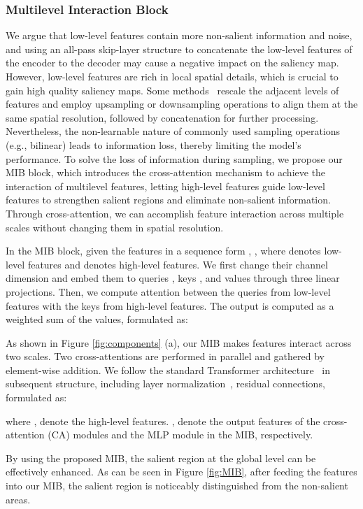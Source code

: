 \documentclass[lettersize,journal]{IEEEtran}
\begin{document}
\subsubsection{Multilevel Interaction Block}
We argue that low-level features contain more non-salient information and noise, and using an all-pass skip-layer structure to concatenate the low-level features of the encoder to the decoder may cause a negative impact on the saliency map. However, low-level features are rich in local spatial details, which is crucial to gain high quality saliency maps. Some methods~\cite {MiNet,ICON} rescale the adjacent levels of features and employ upsampling or downsampling operations to align them at the same spatial resolution, followed by concatenation for further processing. Nevertheless, the non-learnable nature of commonly used sampling operations (e.g., bilinear) leads to information loss, thereby limiting the model's performance. To solve the loss of information during sampling, we propose our MIB block, which introduces the cross-attention mechanism to achieve the interaction of multilevel features, letting high-level features guide low-level features to strengthen salient regions and eliminate non-salient information. Through cross-attention, we can accomplish feature interaction across multiple scales without changing them in spatial resolution. 

In the MIB block, given the features in a sequence form , , where  denotes low-level features and  denotes high-level features. We first change their channel dimension and embed them to queries , keys , and values  through three linear projections. Then, we compute attention between the queries from low-level features with the keys from high-level features. The output is computed as a weighted sum of the values, formulated as: 



As shown in Figure \ref{fig:components} (a), our MIB makes features interact across two scales. Two cross-attentions are performed in parallel and gathered by element-wise addition. We follow the standard Transformer architecture~\cite{Attentionisallyouneed} in subsequent structure, including layer normalization~\cite{LN}, residual connections, formulated as:

where ,  denote the high-level features. ,  denote the output features of the cross-attention (CA) modules and the MLP module in the MIB, respectively. 

By using the proposed MIB, the salient region at the global level can be effectively enhanced. As can be seen in Figure \ref{fig:MIB}, after feeding the features into our MIB, the salient region is noticeably distinguished from the non-salient areas. 
\end{document}
